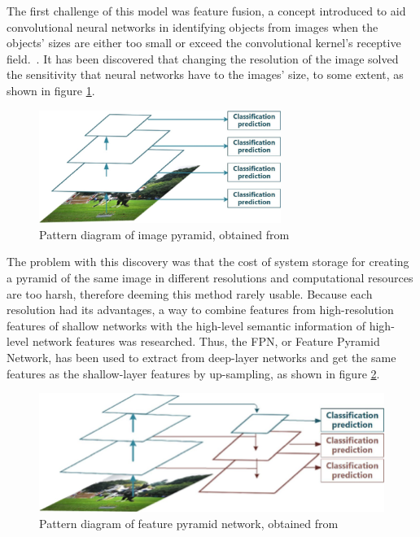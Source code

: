 The first challenge of this model was feature fusion, a concept introduced to aid convolutional neural networks in identifying objects from images when the objects' sizes are either too small or exceed the convolutional kernel's receptive field.~\cite{carte9}. It has been discovered that changing the resolution of the image solved the sensitivity that neural networks have to the images' size, to some extent, as shown in figure \ref{fig:fig4}.

\begin{figure}[!ht]
    \centering
    \includegraphics[width=0.7\textwidth]{figures/Figure4.png}
    \caption{Pattern diagram of image pyramid, obtained from ~\cite{link13}}
    \label{fig:fig4}
\end{figure}

The problem with this discovery was that the cost of system storage for creating a pyramid of the same image in different resolutions and computational resources are too harsh, therefore deeming this method rarely usable. Because each resolution had its advantages, a way to combine features from high-resolution features of shallow networks with the high-level semantic information of high-level network features was researched. Thus, the FPN, or Feature Pyramid Network, has been used to extract from deep-layer networks and get the same features as the shallow-layer features by up-sampling, as shown in figure \ref{fig:fig5}. 

\begin{figure}[!ht]
    \centering
    \includegraphics[width=0.7\linewidth]{figures/Figure5.png}
    \caption{Pattern diagram of feature pyramid network, obtained from ~\cite{link12}}
    \label{fig:fig5}
\end{figure}

